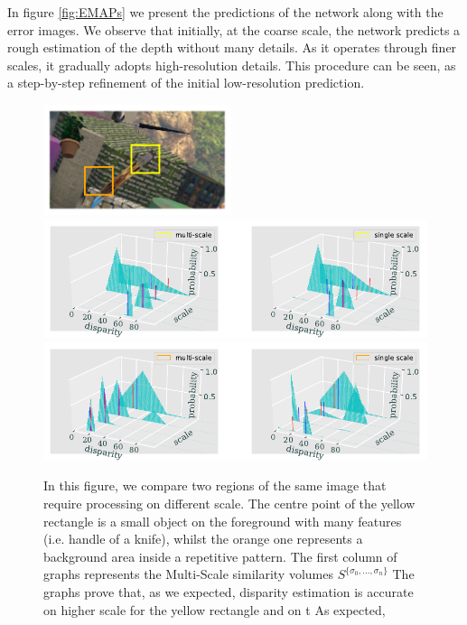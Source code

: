\documentclass[runningheads]{llncs}
\begin{document}
In figure \ref{fig:EMAPs} we present the predictions of the network along with the error images. We observe that initially, at the coarse scale, the network predicts a rough estimation of the depth without many details. As it operates through finer scales, it gradually adopts high-resolution details. This procedure can be seen, as a step-by-step refinement of the initial low-resolution prediction.

\begin{figure}[h]
    \begin{center}
        \includegraphics[width=0.49\textwidth]{paper/latex/figures/multiscale_importance_image_patches.pdf}\\
        \includegraphics[width=\textwidth]{paper/latex/figures/multiscale_importance_graph_high_resolution.pdf}\\
        \includegraphics[width=\textwidth]{figures/multiscale_importance_graph_low_resolution.pdf}
    \end{center}
    
    \caption{In this figure, we compare two regions of the same image that require processing on different scale. The centre point of the yellow rectangle is a small object on the foreground with many features (i.e. handle of a knife), whilst the orange one represents a background area inside a repetitive pattern. The first column of graphs represents the Multi-Scale similarity volumes $S^{\{ \sigma_0, ..., \sigma_n \} }$ The graphs prove that, as we expected, disparity estimation is accurate on higher scale for the yellow rectangle and on t As expected,  }
    \label{fig:multiscale_importance}
\end{figure}
\end{document}
